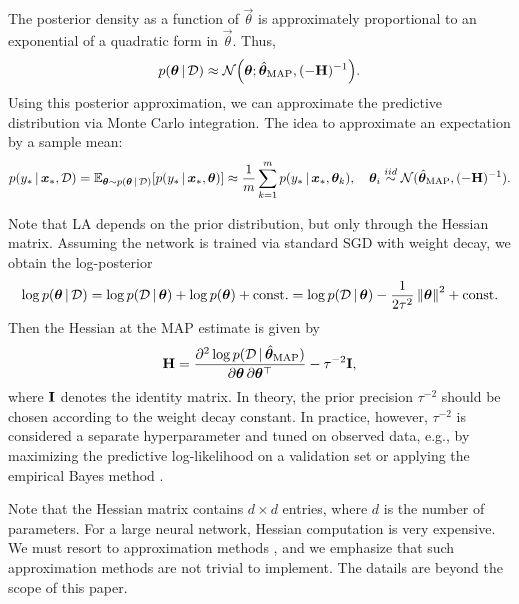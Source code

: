 The posterior density as a function of $\vec{\theta}$ is approximately proportional to an exponential of a quadratic form in $\vec{\theta}$. Thus,
\begin{equation} \label{eq:la}
  p(\vec{\theta} \given \mathcal{D}) \approx \mathcal{N}\mleft( \vec{\theta}; \hat{\vec{\theta}}_\text{MAP}, (- \mat{H})^{-1} \mright).
\end{equation}
Using this posterior approximation, we can approximate the predictive distribution via Monte Carlo integration. The idea to approximate an expectation by a sample mean:
\begin{equation*}
  p(y_* \,|\, \bm{x}_*, \mathcal{D}) = \mathbb{E}_{\bm{\theta} \sim p(\bm{\theta} \,|\, \mathcal{D})}[p(y_* \,|\, \bm{x}_*, \bm{\theta})]
  \approx \frac{1}{m} \sum_{k=1}^{m} p(y_* \,|\, \bm{x}_*, \bm{\theta}_k), \quad
  \bm{\theta}_i \overset{iid}{\sim} \mathcal{N}(\hat{\bm{\theta}}_\text{MAP}, (- \bm{\mathbf{H}})^{-1}).
\end{equation*}

Note that LA depends on the prior distribution, but only through the Hessian matrix. Assuming the network is trained via standard SGD with weight decay, we obtain the log-posterior
\begin{align*}
  \log p(\bm{\theta} \,|\, \mathcal{D}) = \log p(\mathcal{D} \,|\, \bm{\theta}) + \log p(\bm{\theta}) + \text{const.}
  = \log p(\mathcal{D} \,|\, \bm{\theta}) - \frac{1}{2 \tau^2} \left\| \bm{\theta} \right\|^2 + \text{const.}
\end{align*}
Then the Hessian at the MAP estimate is given by
\begin{equation} \label{eq:hessian-gaussian-prior}
  \bm{\mathbf{H}} = \pdv{\log p(\mathcal{D} \,|\,\hat{\bm{\theta}}_\text{MAP})}{\bm{\theta}, \bm{\theta}^\top} - \tau^{-2} \bm{\mathbf{I}},
\end{equation}
where $\bm{\mathbf{I}}$ denotes the identity matrix. In theory, the prior precision $\tau^{-2}$ should be chosen according to the weight decay constant. In practice, however, $\tau^{-2}$ is considered a separate hyperparameter \citep{ritterScalableLA2018,kristiadiABitBayesian2020,immerLLA2021a} and tuned on observed data, e.g., by maximizing the predictive log-likelihood on a validation set \citep{ritterScalableLA2018} or applying the empirical Bayes method \citep{immerMargLik2021}.

Note that the Hessian matrix contains $d \times d$ entries, where $d$ is the number of parameters. For a large neural network, Hessian computation is very expensive. We must resort to approximation methods \citep{daxbergerLaplaceRedux2021}, and we emphasize that such approximation methods are not trivial to implement. The datails are beyond the scope of this paper.

